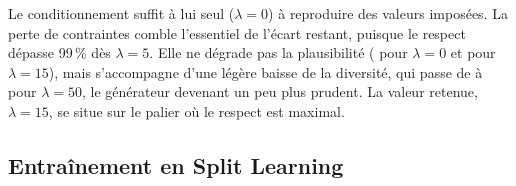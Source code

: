 \documentclass[twocolumn]{ICCKjournal}
\begin{document}
Le conditionnement suffit à lui seul ($\lambda=0$) à reproduire
\resAblLambdaZeroPZeroRespectBrut{} des valeurs imposées. La perte de
contraintes comble l'essentiel de l'écart restant, puisque le respect
dépasse 99\,\% dès $\lambda=5$. Elle ne dégrade pas la plausibilité
(\resAblLambdaZeroPZeroPlausibiliteSnap{} pour $\lambda=0$ et
\resAblLambdaUnCinqPZeroPlausibiliteSnap{} pour $\lambda=15$), mais
s'accompagne d'une légère baisse de la diversité, qui passe de
\resAblLambdaZeroPZeroDiversite{} à \resAblLambdaCinqZeroPZeroDiversite{}
pour $\lambda=50$, le générateur devenant un peu plus prudent. La valeur
retenue, $\lambda=15$, se situe sur le palier où le respect est
maximal.

\subsection{Entraînement en Split Learning}
\label{sec:sl-results}
\end{document}

